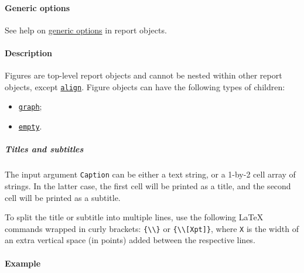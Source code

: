 \paragraph{Generic options}\label{generic-options}

See help on \href{report/Contents}{generic options} in report objects.

\paragraph{Description}\label{description}

Figures are top-level report objects and cannot be nested within other
report objects, except \href{report/align}{\texttt{align}}. Figure
objects can have the following types of children:

\begin{itemize}
\itemsep1pt\parskip0pt
\item
  \href{report/graph}{\texttt{graph}};
\item
  \href{report/empty}{\texttt{empty}}.
\end{itemize}

\subparagraph{Titles and subtitles}\label{titles-and-subtitles}

The input argument \texttt{Caption} can be either a text string, or a
1-by-2 cell array of strings. In the latter case, the first cell will be
printed as a title, and the second cell will be printed as a subtitle.

To split the title or subtitle into multiple lines, use the following
LaTeX commands wrapped in curly brackets:
\texttt{\{\textbackslash{}\textbackslash{}\}} or
\texttt{\{\textbackslash{}\textbackslash{}{[}Xpt{]}\}}, where \texttt{X}
is the width of an extra vertical space (in points) added between the
respective lines.

\paragraph{Example}\label{example}


